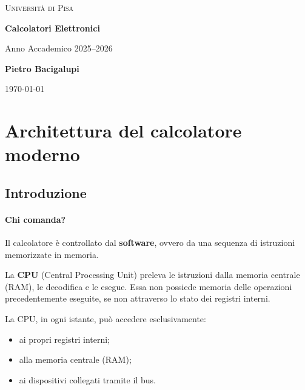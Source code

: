 \documentclass[a4paper,12pt]{article}
\begin{document}
	
	\begin{titlepage}
		\centering
		
		{\scshape\LARGE Università di Pisa \par}
		\vspace{0.5cm}
		
		{\Huge\bfseries Calcolatori Elettronici \par}
		\vspace{0.5cm}
		{\Large Anno Accademico 2025--2026 \par}
		
		\vfill
		
		{\Large\textbf{Pietro Bacigalupi} \par}
		\vspace{0.5cm}
		
		\vfill
		
		{\large \today\par}
		
	\end{titlepage}
	
	\tableofcontents
	\newpage
	\section{Architettura del calcolatore moderno}
	\subsection{Introduzione}
	
	\paragraph{Chi comanda?}
	Il calcolatore è controllato dal \textbf{software}, ovvero da una sequenza di istruzioni memorizzate in memoria.
	
	La \textbf{CPU} (Central Processing Unit) preleva le istruzioni dalla memoria centrale (RAM), le decodifica e le esegue. 
	Essa non possiede memoria delle operazioni precedentemente eseguite, se non attraverso lo stato dei registri interni.
	
	La CPU, in ogni istante, può accedere esclusivamente:
	\begin{itemize}
		\item ai propri registri interni;
		\item alla memoria centrale (RAM);
		\item ai dispositivi collegati tramite il bus.
	\end{itemize}
	
\end{document}
